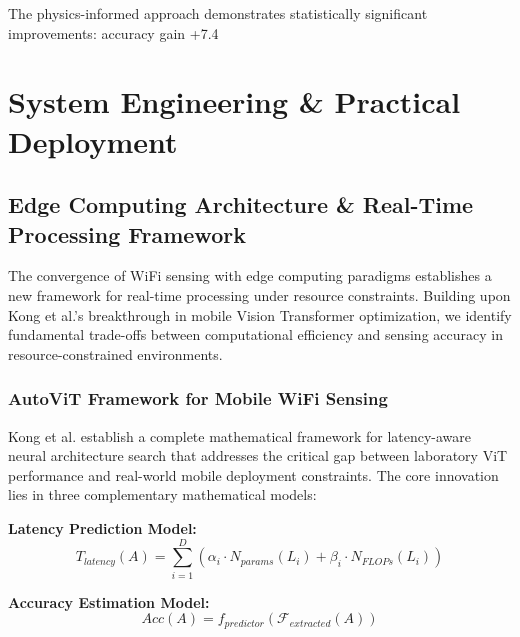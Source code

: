 \documentclass[journal]{IEEEtran}
\begin{document}
The physics-informed approach demonstrates statistically significant improvements: accuracy gain +7.4%

\section{System Engineering \& Practical Deployment}
\label{sec:system_engineering}


\subsection{Edge Computing Architecture \& Real-Time Processing Framework}

The convergence of WiFi sensing with edge computing paradigms establishes a new framework for real-time processing under resource constraints. Building upon Kong et al.'s \cite{kong2025autovit} breakthrough in mobile Vision Transformer optimization, we identify fundamental trade-offs between computational efficiency and sensing accuracy in resource-constrained environments.

\subsubsection{AutoViT Framework for Mobile WiFi Sensing}

Kong et al. establish a complete mathematical framework for latency-aware neural architecture search that addresses the critical gap between laboratory ViT performance and real-world mobile deployment constraints. The core innovation lies in three complementary mathematical models:

\textbf{Latency Prediction Model:}
\begin{equation}
T_{latency}(A) = \sum_{i=1}^{D} \left( \alpha_i \cdot N_{params}(L_i) + \beta_i \cdot N_{FLOPs}(L_i) \right)
\label{eq:autovit_latency}
\end{equation}

\textbf{Accuracy Estimation Model:}
\begin{equation}
Acc(A) = f_{predictor}(\mathcal{F}_{extracted}(A))
\label{eq:autovit_accuracy}
\end{equation}
\end{document}
